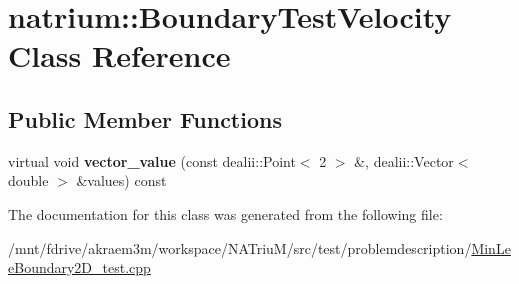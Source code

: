\hypertarget{classnatrium_1_1BoundaryTestVelocity}{
\section{natrium::BoundaryTestVelocity Class Reference}
\label{classnatrium_1_1BoundaryTestVelocity}
}
\subsection*{Public Member Functions}
\begin{DoxyCompactItemize}
\item 
\hypertarget{classnatrium_1_1BoundaryTestVelocity_a79517bd2413986c38f4e944faea57a48}{
virtual void {\bfseries vector\_\-value} (const dealii::Point$<$ 2 $>$ \&, dealii::Vector$<$ double $>$ \&values) const }
\label{classnatrium_1_1BoundaryTestVelocity_a79517bd2413986c38f4e944faea57a48}

\end{DoxyCompactItemize}


The documentation for this class was generated from the following file:\begin{DoxyCompactItemize}
\item 
/mnt/fdrive/akraem3m/workspace/NATriuM/src/test/problemdescription/\hyperlink{MinLeeBoundary2D__test_8cpp}{MinLeeBoundary2D\_\-test.cpp}\end{DoxyCompactItemize}

